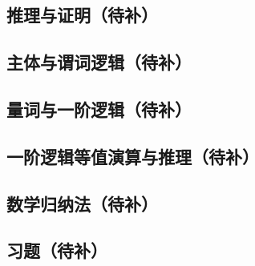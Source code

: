 \subsection{推理与证明（待补）}
\subsection{主体与谓词逻辑（待补）}
\subsection{量词与一阶逻辑（待补）}
\subsection{一阶逻辑等值演算与推理（待补）}
\subsection{数学归纳法（待补）}
\subsection{习题（待补）}